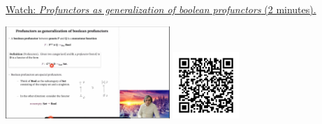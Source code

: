 
\begin{minipage}{10cm}
    \href{https://act4e-spring21.netlify.app/videos/spring2021-profunctors:profunctors.html}{Watch: \emph{Profunctors as generalization of boolean profunctors} (2 minutes).}
        
    \href{https://act4e-spring21.netlify.app/videos/spring2021-profunctors:profunctors.html}{\includegraphics[height=3.5cm]{spring2021-profunctors:profunctors/thumbnails.jpg}}
    \href{https://act4e-spring21.netlify.app/videos/spring2021-profunctors:profunctors.html}{\includegraphics[height=2.5cm]{spring2021-profunctors:profunctors/qrcode.png}}
\end{minipage}

